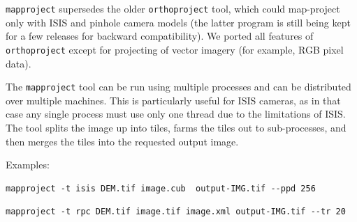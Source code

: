 \texttt{mapproject} supersedes the older
\texttt{orthoproject} tool, which could map-project only with ISIS and
pinhole camera models (the latter program is still being kept for a few
releases for backward compatibility). We ported all features of
\texttt{orthoproject} except for projecting of vector imagery (for
example, RGB pixel data).

The \texttt{mapproject} tool can be run using multiple processes and can be
distributed over multiple machines. This is particularly useful for
ISIS cameras, as in that case any single process must use only one thread
due to the limitations of ISIS.  The tool splits the image up into tiles,
farms the tiles out to sub-processes, and then merges the tiles into the
requested output image.

Examples:
\begin{verbatim}
mapproject -t isis DEM.tif image.cub  output-IMG.tif --ppd 256
\end{verbatim}

\begin{verbatim}
mapproject -t rpc DEM.tif image.tif image.xml output-IMG.tif --tr 20
\end{verbatim}

